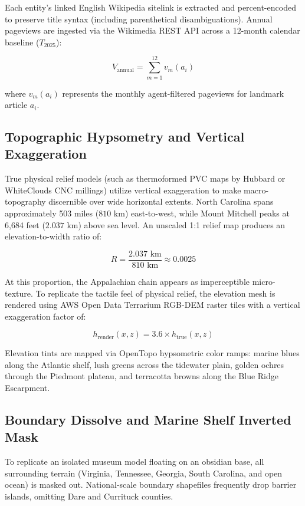 \documentclass[11pt,letterpaper]{article}
\begin{document}
Each entity's linked English Wikipedia sitelink is extracted and percent-encoded to preserve title syntax (including parenthetical disambiguations). Annual pageviews are ingested via the Wikimedia REST API across a 12-month calendar baseline ($T_{2025}$):

\begin{equation}
V_{\text{annual}} = \sum_{m=1}^{12} v_m(a_i)
\end{equation}

\noindent where $v_m(a_i)$ represents the monthly agent-filtered pageviews for landmark article $a_i$.

\subsection{Topographic Hypsometry and Vertical Exaggeration}
True physical relief models (such as thermoformed PVC maps by Hubbard or WhiteClouds CNC millings) utilize vertical exaggeration to make macro-topography discernible over wide horizontal extents. North Carolina spans approximately 503 miles ($810\text{ km}$) east-to-west, while Mount Mitchell peaks at 6,684 feet ($2.037\text{ km}$) above sea level. An unscaled 1:1 relief map produces an elevation-to-width ratio of:

\begin{equation}
R = \frac{2.037\text{ km}}{810\text{ km}} \approx 0.0025
\end{equation}

At this proportion, the Appalachian chain appears as imperceptible micro-texture. To replicate the tactile feel of physical relief, the elevation mesh is rendered using AWS Open Data Terrarium RGB-DEM raster tiles with a vertical exaggeration factor of:

\begin{equation}
h_{\text{render}}(x, z) = 3.6 \times h_{\text{true}}(x, z)
\end{equation}

Elevation tints are mapped via OpenTopo hypsometric color ramps: marine blues along the Atlantic shelf, lush greens across the tidewater plain, golden ochres through the Piedmont plateau, and terracotta browns along the Blue Ridge Escarpment.

\subsection{Boundary Dissolve and Marine Shelf Inverted Mask}
To replicate an isolated museum model floating on an obsidian base, all surrounding terrain (Virginia, Tennessee, Georgia, South Carolina, and open ocean) is masked out. National-scale boundary shapefiles frequently drop barrier islands, omitting Dare and Currituck counties. 
\end{document}
